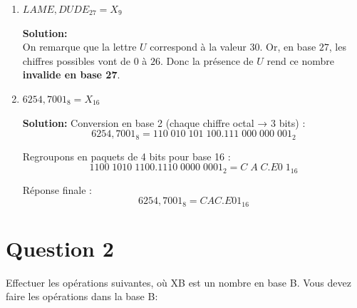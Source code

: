 \documentclass{article}
\begin{document}
\begin{enumerate}[label=\alph*), itemsep=2em]
    \item $LAME,DUDE_{27} = X_{9}$

    \textbf{Solution:} \\
    On remarque que la lettre $U$ correspond à la valeur $30$.  
    Or, en base $27$, les chiffres possibles vont de $0$ à $26$.  
    Donc la présence de $U$ rend ce nombre \textbf{invalide en base 27}.  

    \item $6254,7001_{8} = X_{16}$

    \textbf{Solution:}  
    Conversion en base 2 (chaque chiffre octal → 3 bits) :
    \[
    6254,7001_{8} = 110\;010\;101\;100.111\;000\;000\;001_{2}
    \]

    Regroupons en paquets de 4 bits pour base 16 :
    \[
    1100\;1010\;1100.1110\;0000\;0001_{2} = C\;A\;C.E0\;1_{16}
    \]

    Réponse finale :
    \[
    6254,7001_{8} = CAC.E01_{16}
    \]
\end{enumerate} 

\newpage

\section*{Question 2}
Effectuer les opérations suivantes, où XB est un nombre en base B. Vous devez faire
les opérations dans la base B:
\end{document}
